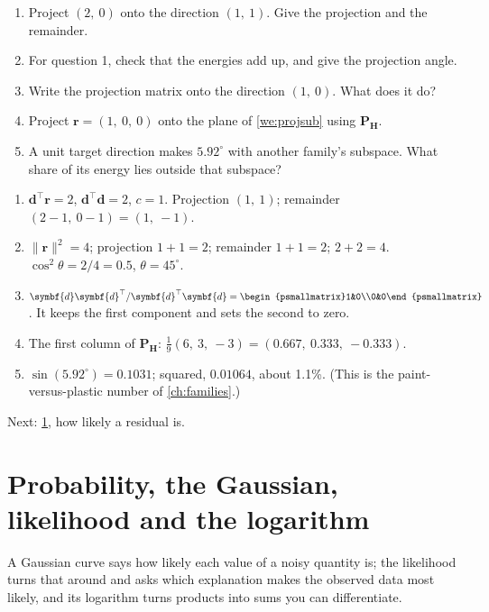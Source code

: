 \documentclass[11pt,a4paper,oneside,openany]{book}
\newcommand{\B}[1]{{\symbf{#1}}}
\newcommand{\B}[1]{{\bm{#1}}}
\newcommand{\T}{^{\top}}
\newcommand{\nrm}[1]{\lVert #1\rVert}
\newcommand{\vr}{\B{r}}
\newcommand{\vd}{\B{d}}
\newcommand{\mH}{\B{H}}
\newcommand{\mP}{\B{P}}
\newcommand{\nextchapter}[1]{\par\medskip\noindent\hfill\textsf{\small Next: #1}\par}
\begin{document}
\begin{checkyourself}
\begin{enumerate}
\item Project $(2,\ 0)$ onto the direction $(1,\ 1)$. Give the projection and the remainder.
\item For question 1, check that the energies add up, and give the projection angle.
\item Write the projection matrix onto the direction $(1,\ 0)$. What does it do?
\item Project $\vr=(1,\ 0,\ 0)$ onto the plane of \cref{we:projsub} using $\mP_{\mH}$.
\item A unit target direction makes $5.92^\circ$ with another family's subspace. What share of its energy lies outside that
  subspace?
\end{enumerate}
\end{checkyourself}

\begin{answers}
\begin{enumerate}
\item $\vd\T\vr=2$, $\vd\T\vd=2$, $c=1$. Projection $(1,\ 1)$; remainder $(2-1,\ 0-1)=(1,\ -1)$.
\item $\nrm{\vr}^2=4$; projection $1+1=2$; remainder $1+1=2$; $2+2=4$. $\cos^2\theta=2/4=0.5$, $\theta=45^\circ$.
\item $\vd\vd\T/\vd\T\vd=\begin{psmallmatrix}1&0\\0&0\end{psmallmatrix}$. It keeps the first component and sets the second to
  zero.
\item The first column of $\mP_{\mH}$: $\frac19(6,\ 3,\ -3)=(0.667,\ 0.333,\ -0.333)$.
\item $\sin(5.92^\circ)=0.1031$; squared, $0.01064$, about 1.1\%. (This is the paint-versus-plastic number of
  \cref{ch:families}.)
\end{enumerate}
\end{answers}

\nextchapter{\cref{ch:prob}, how likely a residual is.}
\chapter{Probability, the Gaussian, likelihood and the logarithm}
\label{ch:prob}

\begin{onething}
A Gaussian curve says how likely each value of a noisy quantity is; the likelihood turns that around and asks which
explanation makes the observed data most likely, and its logarithm turns products into sums you can differentiate.
\end{onething}
\end{document}
